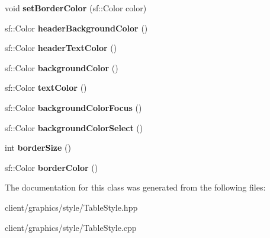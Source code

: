 \begin{DoxyCompactItemize}
\item 
\hypertarget{classgraphics_1_1_table_style_ada5bd6f169aea8adb420d59284c38419}{void {\bfseries set\-Border\-Color} (sf\-::\-Color color)}\label{classgraphics_1_1_table_style_ada5bd6f169aea8adb420d59284c38419}

\item 
\hypertarget{classgraphics_1_1_table_style_a0f8b0d66c8ebeefaadc6b6d3d13ea4a4}{sf\-::\-Color {\bfseries header\-Background\-Color} ()}\label{classgraphics_1_1_table_style_a0f8b0d66c8ebeefaadc6b6d3d13ea4a4}

\item 
\hypertarget{classgraphics_1_1_table_style_a84c56ad8af4918d0705b08150fbf9dac}{sf\-::\-Color {\bfseries header\-Text\-Color} ()}\label{classgraphics_1_1_table_style_a84c56ad8af4918d0705b08150fbf9dac}

\item 
\hypertarget{classgraphics_1_1_table_style_ad16474f999b8e1a0332bd713d193f154}{sf\-::\-Color {\bfseries background\-Color} ()}\label{classgraphics_1_1_table_style_ad16474f999b8e1a0332bd713d193f154}

\item 
\hypertarget{classgraphics_1_1_table_style_a8397d94085801c9a79553525a40cc292}{sf\-::\-Color {\bfseries text\-Color} ()}\label{classgraphics_1_1_table_style_a8397d94085801c9a79553525a40cc292}

\item 
\hypertarget{classgraphics_1_1_table_style_a9341ceaccfc95988a8f735ea917c66e5}{sf\-::\-Color {\bfseries background\-Color\-Focus} ()}\label{classgraphics_1_1_table_style_a9341ceaccfc95988a8f735ea917c66e5}

\item 
\hypertarget{classgraphics_1_1_table_style_ad48c289b6770f86dd173d5b24f235496}{sf\-::\-Color {\bfseries background\-Color\-Select} ()}\label{classgraphics_1_1_table_style_ad48c289b6770f86dd173d5b24f235496}

\item 
\hypertarget{classgraphics_1_1_table_style_a57ed7a14c3f2bf260d58021b45507488}{int {\bfseries border\-Size} ()}\label{classgraphics_1_1_table_style_a57ed7a14c3f2bf260d58021b45507488}

\item 
\hypertarget{classgraphics_1_1_table_style_a45ddf75c2663badbaf0c438b2f48a527}{sf\-::\-Color {\bfseries border\-Color} ()}\label{classgraphics_1_1_table_style_a45ddf75c2663badbaf0c438b2f48a527}

\end{DoxyCompactItemize}


The documentation for this class was generated from the following files\-:\begin{DoxyCompactItemize}
\item 
client/graphics/style/Table\-Style.\-hpp\item 
client/graphics/style/Table\-Style.\-cpp\end{DoxyCompactItemize}
